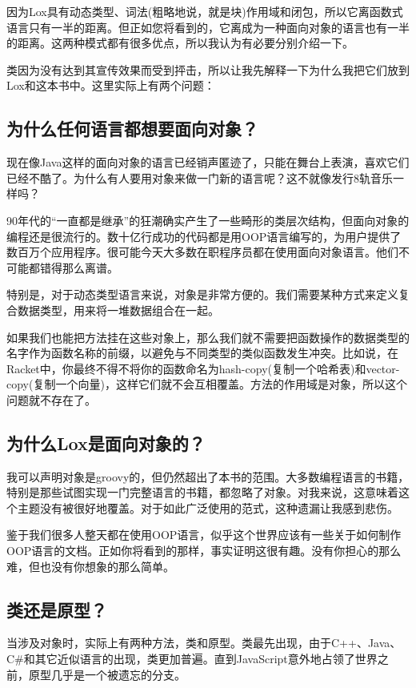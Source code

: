 \documentclass[cn,11pt,chinese]{elegantbook}
\begin{document}
因为Lox具有动态类型、词法(粗略地说，就是块)作用域和闭包，所以它离函数式语言只有一半的距离。但正如您将看到的，它离成为一种面向对象的语言也有一半的距离。这两种模式都有很多优点，所以我认为有必要分别介绍一下。

类因为没有达到其宣传效果而受到抨击，所以让我先解释一下为什么我把它们放到Lox和这本书中。这里实际上有两个问题：

\subsection{为什么任何语言都想要面向对象？}

现在像Java这样的面向对象的语言已经销声匿迹了，只能在舞台上表演，喜欢它们已经不酷了。为什么有人要用对象来做一门新的语言呢？这不就像发行8轨音乐一样吗？

90年代的“一直都是继承”的狂潮确实产生了一些畸形的类层次结构，但面向对象的编程还是很流行的。数十亿行成功的代码都是用OOP语言编写的，为用户提供了数百万个应用程序。很可能今天大多数在职程序员都在使用面向对象语言。他们不可能都错得那么离谱。

特别是，对于动态类型语言来说，对象是非常方便的。我们需要某种方式来定义复合数据类型，用来将一堆数据组合在一起。

如果我们也能把方法挂在这些对象上，那么我们就不需要把函数操作的数据类型的名字作为函数名称的前缀，以避免与不同类型的类似函数发生冲突。比如说，在Racket中，你最终不得不将你的函数命名为hash-copy(复制一个哈希表)和vector-copy(复制一个向量)，这样它们就不会互相覆盖。方法的作用域是对象，所以这个问题就不存在了。

\subsection{为什么Lox是面向对象的？}

我可以声明对象是groovy的，但仍然超出了本书的范围。大多数编程语言的书籍，特别是那些试图实现一门完整语言的书籍，都忽略了对象。对我来说，这意味着这个主题没有被很好地覆盖。对于如此广泛使用的范式，这种遗漏让我感到悲伤。

鉴于我们很多人整天都在使用OOP语言，似乎这个世界应该有一些关于如何制作OOP语言的文档。正如你将看到的那样，事实证明这很有趣。没有你担心的那么难，但也没有你想象的那么简单。

\subsection{类还是原型？}

当涉及对象时，实际上有两种方法，类和原型。类最先出现，由于C++、Java、C\#和其它近似语言的出现，类更加普遍。直到JavaScript意外地占领了世界之前，原型几乎是一个被遗忘的分支。
\end{document}

